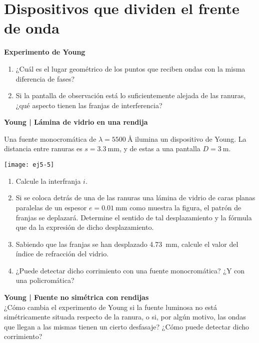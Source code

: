 \section*{Dispositivos que dividen el frente de onda}

\item \textbf{Experimento de Young}
\begin{enumerate}
	\item ¿Cuál es el lugar geométrico de los puntos que reciben ondas con la misma diferencia de fases?
	\item Si la pantalla de observación está lo suficientemente alejada de las ranuras, ¿qué aspecto tienen las franjas de interferencia?
\end{enumerate}



\item \textbf{Young | Lámina de vidrio en una rendija}\\ 
\begin{minipage}[t][2cm]{0.6\textwidth}
Una fuente monocromática de $\lambda = \SI{5500}{\angstrom}$ ilumina un dispositivo de Young.
La distancia entre ranuras es $s = \SI{3.3}{\milli\metre}$, y de estas a una pantalla $D = \SI{3}{\metre}$.
\end{minipage}
\begin{minipage}[c][3cm][t]{0.35\textwidth}
	\texttt{[image: ej5-5]}
\end{minipage}
\begin{enumerate}
	\item Calcule la interfranja $i$.
	\item Si se coloca detrás de una de las ranuras una lámina de vidrio de caras planas paralelas de un espesor $e = \SI{0.01}{\milli\metre}$ como muestra la figura, el patrón de franjas se deplazará.
	Determine el sentido de tal desplazamiento y la fórmula que da la expresión de dicho desplazamiento.
	\item Sabiendo que las franjas se han desplazado \SI{4.73}{\milli\metre}, calcule el valor del índice de refracción del vidrio.
	\item ¿Puede detectar dicho corrimiento con una fuente monocromática?
	¿Y con una policromática?
\end{enumerate}



\item 
\textbf{Young | Fuente no simétrica con rendijas}\\
¿Cómo cambia el experimento de Young si la fuente luminosa no está simétricamente situada respecto de la ranura, o si, por algún motivo, las ondas que llegan a las mismas tienen un cierto desfasaje?
¿Cómo puede detectar dicho corrimiento?



